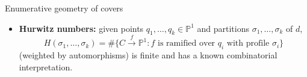 \documentclass{beamer}
\renewcommand{\P}{\mathbb P}
\theoremstyle{definition}
\begin{document}
                                                                                                                                                                                                                          \begin{frame}{Enumerative geometry of covers}

                                                                                                                                                                                                                            \begin{itemize}
                                                                                                                                                                                                                            \item {\bf Hurwitz numbers:}
                                                                                                                                                                                                                              given points $q_1,\dots,q_k\in\P^1$ and
                                                                                                                                                                                                                              partitions $\sigma_1,\dots,\sigma_k$ of $d$,
                                                                                                                                                                                                                              \[
                                                                                                                                                                                                                              H(\sigma_1, \dots,\sigma_k)=\#\{C\xrightarrow{f}\P^1:f\text{ is ramified over }q_i\text{ with profile }\sigma_i\}                                                                                                                                                                                           \]
                                                                                                                                                                                                                              (weighted by automorphisms) is finite and has a known combinatorial interpretation.
                                                                                                                                                                                                                              \begin{itemize}

\end{itemize}
\end{itemize}
\end{frame}
\end{document}
